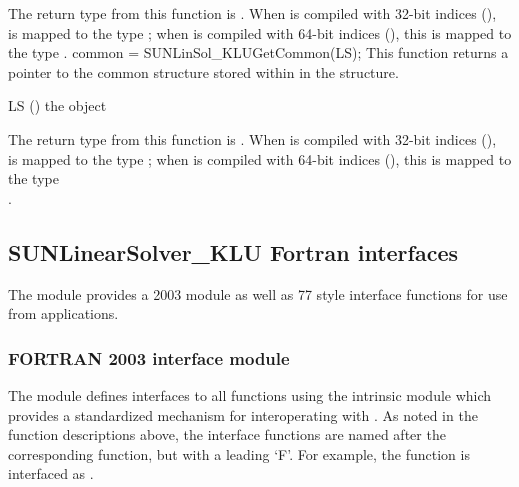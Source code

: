 {
  The return type from this function is .
}
{
  When {\sundials} is compiled with 32-bit indices
  (),\\
   is mapped to the {\klu} type
  ; when {\sundials} is compiled with 64-bit indices
  (), this is mapped to the {\klu}
  type .
}
%
%
{
  common = SUNLinSol\_KLUGetCommon(LS);
}
{
  This function returns a pointer to the {\klu} common structure
  stored within in the {\sunlinsolklu}  structure.
}
{
  \begin{args}[LS]
  \item[LS] ()
    the {\sunlinsolklu} object
  \end{args}
}
{
  The return type from this function is .
}
{
  When {\sundials} is compiled with 32-bit indices
  (),\\
   is mapped to the {\klu} type
  ; when {\sundials} is compiled with 64-bit indices
  (), this is mapped to the {\klu} type\\
  .
}



\subsection{SUNLinearSolver\_KLU Fortran interfaces}
\label{ss:sunlinsol_klu_fortran}

The {\sunlinsolklu} module provides a {\F} 2003 module as well as {\F} 77
style interface functions for use from {\F} applications.

\subsubsection*{FORTRAN 2003 interface module}
The  {\F} module defines interfaces to all
{\sunlinsolklu} {\CC} functions using the intrinsic 
module which provides a standardized mechanism for interoperating with {\CC}. As
noted in the {\CC} function descriptions above, the interface functions are
named after the corresponding {\CC} function, but with a leading `F'. For
example, the function  is interfaced as
.

